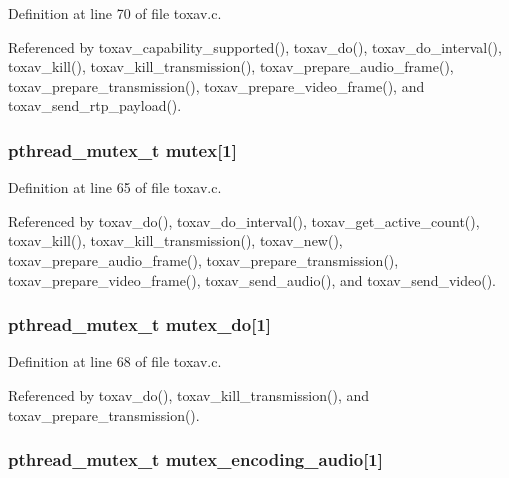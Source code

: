 Definition at line 70 of file toxav.\+c.



Referenced by toxav\+\_\+capability\+\_\+supported(), toxav\+\_\+do(), toxav\+\_\+do\+\_\+interval(), toxav\+\_\+kill(), toxav\+\_\+kill\+\_\+transmission(), toxav\+\_\+prepare\+\_\+audio\+\_\+frame(), toxav\+\_\+prepare\+\_\+transmission(), toxav\+\_\+prepare\+\_\+video\+\_\+frame(), and toxav\+\_\+send\+\_\+rtp\+\_\+payload().

\hypertarget{struct___tox_av_call_ab4293016252c4d4e63549b0773fa0f33}{
\subsubsection[{mutex}]{\setlength{\rightskip}{0pt plus 5cm}pthread\+\_\+mutex\+\_\+t mutex\mbox{[}1\mbox{]}}}\label{struct___tox_av_call_ab4293016252c4d4e63549b0773fa0f33}


Definition at line 65 of file toxav.\+c.



Referenced by toxav\+\_\+do(), toxav\+\_\+do\+\_\+interval(), toxav\+\_\+get\+\_\+active\+\_\+count(), toxav\+\_\+kill(), toxav\+\_\+kill\+\_\+transmission(), toxav\+\_\+new(), toxav\+\_\+prepare\+\_\+audio\+\_\+frame(), toxav\+\_\+prepare\+\_\+transmission(), toxav\+\_\+prepare\+\_\+video\+\_\+frame(), toxav\+\_\+send\+\_\+audio(), and toxav\+\_\+send\+\_\+video().

\hypertarget{struct___tox_av_call_acc4203df7776b6dfe0e5c3922a35e5b0}{
\subsubsection[{mutex\+\_\+do}]{\setlength{\rightskip}{0pt plus 5cm}pthread\+\_\+mutex\+\_\+t mutex\+\_\+do\mbox{[}1\mbox{]}}}\label{struct___tox_av_call_acc4203df7776b6dfe0e5c3922a35e5b0}


Definition at line 68 of file toxav.\+c.



Referenced by toxav\+\_\+do(), toxav\+\_\+kill\+\_\+transmission(), and toxav\+\_\+prepare\+\_\+transmission().

\hypertarget{struct___tox_av_call_ac4c859b6e4ff8e175151fbd0a763e414}{
\subsubsection[{mutex\+\_\+encoding\+\_\+audio}]{\setlength{\rightskip}{0pt plus 5cm}pthread\+\_\+mutex\+\_\+t mutex\+\_\+encoding\+\_\+audio\mbox{[}1\mbox{]}}}\label{struct___tox_av_call_ac4c859b6e4ff8e175151fbd0a763e414}


